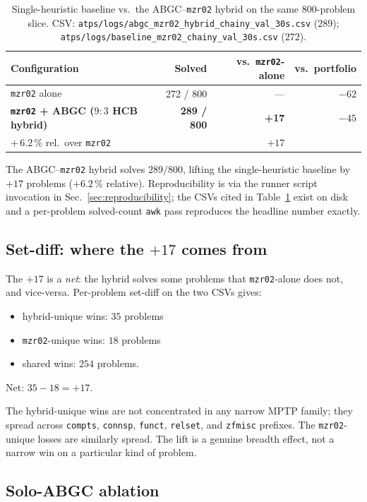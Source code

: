 \documentclass[11pt]{article}
\newcommand{\lpath}[1]{\texttt{\nolinkurl{#1}}}
\newcommand{\lid}[1]{{\ttfamily\nolinkurl{#1}}}
\begin{document}
\begin{table}[t]
\centering
\begin{tabular}{lrrr}
\toprule
Configuration & Solved & vs.\ \texttt{mzr02}-alone & vs.\ portfolio \\
\midrule
\texttt{mzr02} alone & 272 / 800 & --- & $-62$ \\
\textbf{\texttt{mzr02} + ABGC ($9{:}3$ HCB hybrid)} & \textbf{289 / 800} & \textbf{+17} & $-45$ \\
\midrule
$+\,6.2\,\%$ rel.\ over \texttt{mzr02} & & $+ 17$ & \\
\bottomrule
\end{tabular}
\caption{Single-heuristic baseline vs.\ the ABGC--\texttt{mzr02} hybrid on
the same 800-problem slice. CSV: \lpath{atps/logs/abgc_mzr02_hybrid_chainy_val_30s.csv}
($289$); \lpath{atps/logs/baseline_mzr02_chainy_val_30s.csv} ($272$).}
\label{tab:hybrid}
\end{table}

The ABGC--\texttt{mzr02} hybrid solves $289/800$, lifting the single-heuristic
baseline by $+17$ problems ($+6.2\,\%$ relative). Reproducibility is via the
runner script invocation in Sec.~\ref{sec:reproducibility}; the CSVs cited in
Table~\ref{tab:hybrid} exist on disk and a per-problem solved-count
\lid{awk} pass reproduces the headline number exactly.

\subsection{Set-diff: where the $+17$ comes from}

The $+17$ is a \emph{net}: the hybrid solves some problems that
\texttt{mzr02}-alone does not, and vice-versa. Per-problem set-diff on the
two CSVs gives:
\begin{itemize}
\item hybrid-unique wins: $35$ problems
\item \texttt{mzr02}-unique wins: $18$ problems
\item shared wins: $254$ problems.
\end{itemize}
Net: $35 - 18 = +17$.

The hybrid-unique wins are not concentrated in any narrow MPTP family; they
spread across \lid{compts}, \lid{connsp}, \lid{funct}, \lid{relset}, and
\lid{zfmisc} prefixes. The \texttt{mzr02}-unique losses are similarly
spread. The lift is a genuine breadth effect, not a narrow win on a
particular kind of problem.

\subsection{Solo-ABGC ablation}\label{sec:act1-solo}
\end{document}
